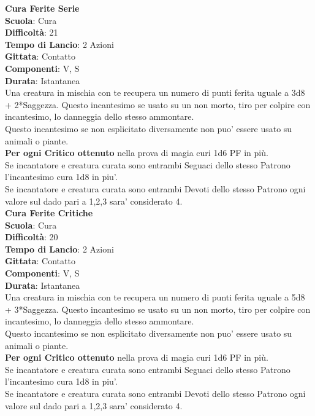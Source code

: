 \begin{multicols}{2}
\medskip\textbf{Cura Ferite Serie}\\
\textbf{Scuola}: Cura\\
\textbf{Difficoltà}: 21\\
\textbf{Tempo di Lancio}: 2 Azioni\\
\textbf{Gittata}: Contatto\\
\textbf{Componenti}: V, S\\
\textbf{Durata}: Istantanea\\
Una creatura in mischia con te recupera un numero di punti ferita uguale a 3d8 + 2*Saggezza. Questo incantesimo se usato su un non morto, tiro per colpire con incantesimo, lo danneggia dello stesso ammontare.\\
Questo incantesimo se non esplicitato diversamente non puo' essere usato su animali o piante.\\
\textbf{Per ogni Critico ottenuto} nella prova di magia curi 1d6 PF in più.\\
Se incantatore e creatura curata sono entrambi Seguaci dello stesso Patrono l'incantesimo cura 1d8 in piu'.\\
Se incantatore e creatura curata sono entrambi Devoti dello stesso Patrono ogni valore sul dado pari a 1,2,3 sara' considerato 4.\\

\medskip\textbf{Cura Ferite Critiche}\\
\textbf{Scuola}: Cura\\
\textbf{Difficoltà}: 20 \\
\textbf{Tempo di Lancio}: 2 Azioni\\
\textbf{Gittata}: Contatto\\
\textbf{Componenti}: V, S\\
\textbf{Durata}: Istantanea\\
Una creatura in mischia con te recupera un numero di punti ferita uguale a 5d8 + 3*Saggezza. Questo incantesimo se usato su un non morto, tiro per colpire con incantesimo, lo danneggia dello stesso ammontare.\\
Questo incantesimo se non esplicitato diversamente non puo' essere usato su animali o piante.\\
\textbf{Per ogni Critico ottenuto} nella prova di magia curi 1d6 PF in più.\\
Se incantatore e creatura curata sono entrambi Seguaci dello stesso Patrono l'incantesimo cura 1d8 in piu'.\\
Se incantatore e creatura curata sono entrambi Devoti dello stesso Patrono ogni valore sul dado pari a 1,2,3 sara' considerato 4.\\


\end{multicols}
